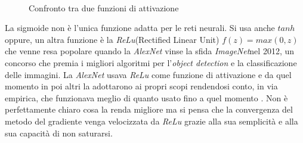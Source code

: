 
\begin{figure}[hbtb]
\centering
{} \qquad
{} \\
\caption{Confronto tra due funzioni di attivazione}
\label{fig:subfig}
\end{figure}

La sigmoide non è l'unica funzione adatta per le reti neurali. Si usa anche $tanh$ oppure, un altra funzione è la \textit{ReLu}(Rectified Linear Unit)  $\displaystyle f(z)=max(0,z)$ che venne resa popolare quando la \textit{AlexNet} vinse la sfida \textit{ImageNet}nel 2012, un concorso che premia i migliori algoritmi per l'\textit{object detection} e la classificazione delle immagini. La \textit{AlexNet} usava \textit{ReLu} come funzione di attivazione e da quel momento in poi altri la adottarono ai propri scopi rendendosi conto, in via empirica, che funzionava meglio di quanto usato fino a quel momento \cite{krizhevsky2012imagenet}. Non è perfettamente chiaro cosa la renda migliore ma si pensa che la convergenza del metodo del gradiente venga velocizzata da \textit{ReLu} grazie alla sua semplicità e alla sua capacità di non saturarsi\cite{cs23}.

